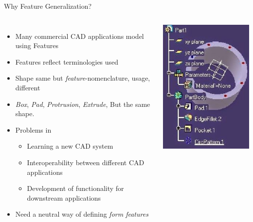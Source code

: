 
\begin{frame}{Why Feature Generalization?}

\begin{columns}[T]
\begin{itemize}[noitemsep,label=\textbullet,topsep=2pt,parsep=2pt,partopsep=2pt]
\item Many commercial CAD applications model using Features
\item Features reflect terminologies used 
\item Shape same but {\em feature}-nomenclature, usage, different
\item {\em Box}, {\em Pad}, {\em Protrusion}, {\em Extrude}, But the same shape. 
\item Problems in 
	\begin{itemize}[noitemsep,label=\textbullet,topsep=2pt,parsep=2pt,partopsep=2pt]
	\item Learning a new CAD system
	\item Interoperability between different CAD applications
	\item Development of functionality for downstream applications
	\end{itemize}
\item Need a neutral way of defining {\em form features}
\end{itemize}


	\includegraphics[width=0.8\linewidth]{../Common/images/CatiaFeatures.jpg}
	

\end{columns}
\end{frame}
